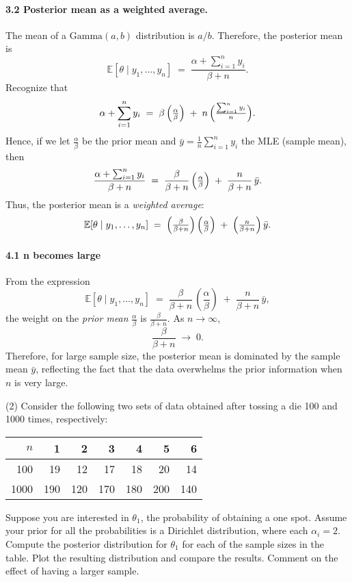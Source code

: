 \documentclass[final,11pt]{article}
\begin{document}
\begin{spacing}{1.25}
{\begin{enumerate}
    \paragraph{3.2 Posterior mean as a weighted average.}
    The mean of a $\mathrm{Gamma}(a, b)$ distribution is $a / b$. Therefore, the posterior mean is
    \[
    \mathbb{E}[\theta \mid y_1,\dots,y_n]
    \;=\;
    \frac{\alpha + \sum_{i=1}^n y_i}{\beta + n}.
    \]
    Recognize that
    \[
    \alpha + \sum_{i=1}^n y_i
    \;=\;
    \beta\,\Bigl(\tfrac{\alpha}{\beta}\Bigr)
    \;+\;
    n\,\Bigl(\tfrac{\sum_{i=1}^n y_i}{n}\Bigr).
    \]
    Hence, if we let $\tfrac{\alpha}{\beta}$ be the prior mean and $\bar{y} = \tfrac{1}{n}\sum_{i=1}^n y_i$ the MLE (sample mean), then
    \[
    \frac{\alpha + \sum_{i=1}^n y_i}{\beta + n}
    \;=\;
    \frac{\beta}{\beta + n}\,\Bigl(\tfrac{\alpha}{\beta}\Bigr)
    \;+\;
    \frac{n}{\beta + n}\,\bar{y}.
    \]
    Thus, the posterior mean is a \emph{weighted average}:
    \[{
    \mathbb{E}[\theta \mid y_1,\dots,y_n]
    \;=\;
    \Bigl(\tfrac{\beta}{\beta + n}\Bigr)\,
    \Bigl(\tfrac{\alpha}{\beta}\Bigr)
    \;+\;
    \Bigl(\tfrac{n}{\beta + n}\Bigr)\,\bar{y}.
    }
    \]

    \paragraph{4.1 n becomes large}
    From the expression
\[
\mathbb{E}[\theta \mid y_1,\dots,y_n]
\;=\;
\frac{\beta}{\beta + n}\,\left(\frac{\alpha}{\beta}\right)
\;+\;
\frac{n}{\beta + n}\,\bar{y},
\]
the weight on the \emph{prior mean} $\frac{\alpha}{\beta}$ is $\frac{\beta}{\beta + n}$. As $n \to \infty$,
\[
\frac{\beta}{\beta + n}
\;\longrightarrow\;
0.
\]
Therefore, for large sample size, the posterior mean is dominated by the sample mean $\bar{y}$, reflecting the fact that the data overwhelms the prior information when $n$ is very large.

\end{enumerate}
}
\newpage 


(2) Consider the following two sets of data obtained after tossing a die 100 and 1000 times, respectively:
\begin{center}
    \begin{tabular}{ r r r r r r r }
        \hline
        $n$ & 1 & 2 & 3 & 4 & 5 & 6 \\
        \hline
        100 & 19 & 12 & 17 & 18 & 20 & 14 \\  
        1000 & 190 & 120 & 170 & 180 & 200 & 140 \\
        \hline
    \end{tabular}
\end{center}
Suppose you are interested in $\theta_1$, the probability of obtaining a one spot. Assume your prior for all the probabilities is a Dirichlet distribution, where each $\alpha_i=2$. Compute the posterior distribution for $\theta_1$ for each of the sample sizes in the table. Plot the resulting distribution and compare the results. Comment on the effect of having a larger sample.


\end{spacing}
\end{document}
